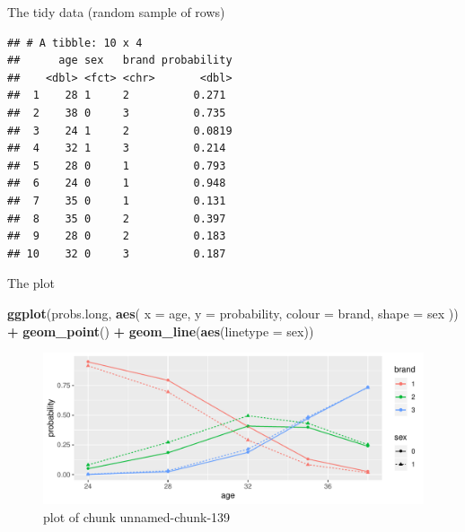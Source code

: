 \documentclass[ignorenonframetext,]{beamer}
\newenvironment{Shaded}{\begin{snugshade}}{\end{snugshade}}
\newcommand{\DataTypeTok}[1]{\textcolor[rgb]{0.13,0.29,0.53}{#1}}
\newcommand{\DecValTok}[1]{\textcolor[rgb]{0.00,0.00,0.81}{#1}}
\newcommand{\KeywordTok}[1]{\textcolor[rgb]{0.13,0.29,0.53}{\textbf{#1}}}
\newcommand{\NormalTok}[1]{#1}
\newcommand{\OperatorTok}[1]{\textcolor[rgb]{0.81,0.36,0.00}{\textbf{#1}}}
\newcommand{\StringTok}[1]{\textcolor[rgb]{0.31,0.60,0.02}{#1}}
\begin{document}
\begin{frame}[fragile]{The tidy data (random sample of rows)}
\protect\hypertarget{the-tidy-data-random-sample-of-rows}{}

\small

\begin{Shaded}
\end{Shaded}

\begin{verbatim}
## # A tibble: 10 x 4
##      age sex   brand probability
##    <dbl> <fct> <chr>       <dbl>
##  1    28 1     2          0.271 
##  2    38 0     3          0.735 
##  3    24 1     2          0.0819
##  4    32 1     3          0.214 
##  5    28 0     1          0.793 
##  6    24 0     1          0.948 
##  7    35 0     1          0.131 
##  8    35 0     2          0.397 
##  9    28 0     2          0.183 
## 10    32 0     3          0.187
\end{verbatim}

\normalsize

\end{frame}

\begin{frame}[fragile]{The plot}
\protect\hypertarget{the-plot-1}{}

\begin{Shaded}
\begin{Highlighting}[]
\KeywordTok{ggplot}\NormalTok{(probs.long, }\KeywordTok{aes}\NormalTok{(}
  \DataTypeTok{x =}\NormalTok{ age, }\DataTypeTok{y =}\NormalTok{ probability,}
  \DataTypeTok{colour =}\NormalTok{ brand, }\DataTypeTok{shape =}\NormalTok{ sex}
\NormalTok{)) }\OperatorTok{+}
\StringTok{  }\KeywordTok{geom_point}\NormalTok{() }\OperatorTok{+}\StringTok{ }\KeywordTok{geom_line}\NormalTok{(}\KeywordTok{aes}\NormalTok{(}\DataTypeTok{linetype =}\NormalTok{ sex))}
\end{Highlighting}
\end{Shaded}

\begin{figure}
\centering
\includegraphics{figure/unnamed-chunk-139-1.pdf}
\caption{plot of chunk unnamed-chunk-139}
\end{figure}

\end{frame}
\end{document}
